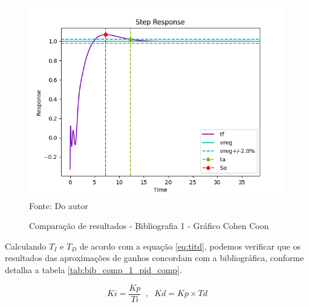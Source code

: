 \begin{figure}[H]
    \centering
    \caption{Comparação de resultados - Bibliografia 1 - Gráfico Cohen Coon}
    \includegraphics[scale=0.8]{figuras/bib_comp_1_code1_out_fig3}
    \label{fig:bib_comp_1_code1_out_fig3}
    \\
    \vspace{0cm}\hspace{0cm}\small{Fonte: Do autor}
\end{figure}

Calculando $T_I$ e $T_D$ de acordo com a equação \ref{eq:titd}, podemos verificar que os resultados das aproximações de
ganhos concordam com a bibliográfica, conforme detalha a tabela \ref{tab:bib_comp_1_pid_comp}.

\begin{equation}
    \label{eq:titd}
    Ki = \frac{Kp}{Ti} \;\; , \;\; Kd = Kp \times Td
\end{equation}

